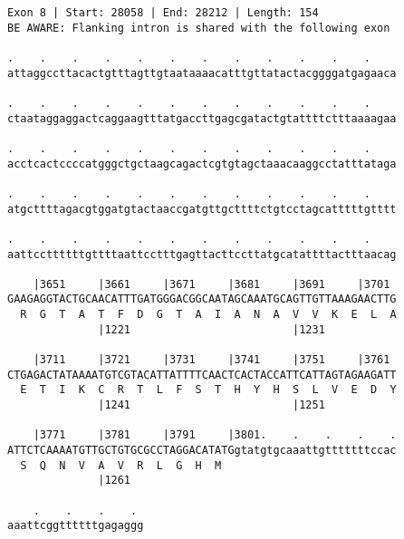 \documentclass{article}
\begin{document}
\begin{Verbatim}[fontfamily=courier]
Exon 8 | Start: 28058 | End: 28212 | Length: 154
BE AWARE: Flanking intron is shared with the following exon

.    .    .    .    .    .    .    .    .    .    .    .    
attaggccttacactgtttagttgtaataaaacatttgttatactacggggatgagaaca

.    .    .    .    .    .    .    .    .    .    .    .    
ctaataggaggactcaggaagtttatgaccttgagcgatactgtattttctttaaaagaa

.    .    .    .    .    .    .    .    .    .    .    .    
acctcactccccatgggctgctaagcagactcgtgtagctaaacaaggcctatttataga

.    .    .    .    .    .    .    .    .    .    .    .    
atgcttttagacgtggatgtactaaccgatgttgcttttctgtcctagcatttttgtttt

.    .    .    .    .    .    .    .    .    .    .    .    
aattccttttttgttttaattcctttgagttacttccttatgcatattttactttaacag

    |3651     |3661     |3671     |3681     |3691     |3701 
GAAGAGGTACTGCAACATTTGATGGGACGGCAATAGCAAATGCAGTTGTTAAAGAACTTG
  R  G  T  A  T  F  D  G  T  A  I  A  N  A  V  V  K  E  L  A
              |1221                         |1231           

    |3711     |3721     |3731     |3741     |3751     |3761 
CTGAGACTATAAAATGTCGTACATTATTTTCAACTCACTACCATTCATTAGTAGAAGATT
  E  T  I  K  C  R  T  L  F  S  T  H  Y  H  S  L  V  E  D  Y
              |1241                         |1251           

    |3771     |3781     |3791     |3801.    .    .    .    .
ATTCTCAAAATGTTGCTGTGCGCCTAGGACATATGgtatgtgcaaattgtttttttccac
  S  Q  N  V  A  V  R  L  G  H  M                           
              |1261                                         

    .    .    .    . 
aaattcggttttttgagaggg
\end{Verbatim}
\newpage
\end{document}

